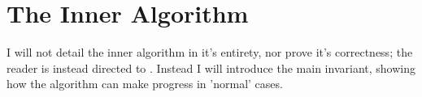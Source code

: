 \section{The Inner Algorithm}
I will not detail the inner algorithm in it's entirety, nor prove it's correctness;
the reader is instead directed to \citep{fasterTarski}. Instead I will introduce
the main invariant, showing how the algorithm can make progress in 'normal'
cases.
